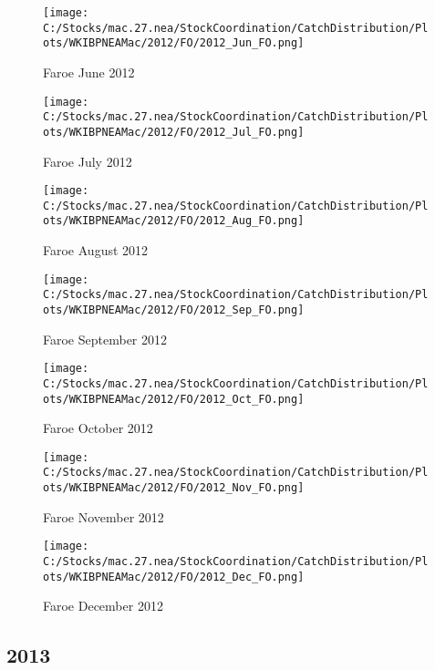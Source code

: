\documentclass{article}
\begin{document}
\begin{figure}
	\centering
		\texttt{[image: C:/Stocks/mac.27.nea/StockCoordination/CatchDistribution/Plots/WKIBPNEAMac/2012/FO/2012\_Jun\_FO.png]}
	\caption{Faroe June 2012}
	\label{fig:2012_Jun_FO}
\end{figure}

\begin{figure}
	\centering
		\texttt{[image: C:/Stocks/mac.27.nea/StockCoordination/CatchDistribution/Plots/WKIBPNEAMac/2012/FO/2012\_Jul\_FO.png]}
	\caption{Faroe July 2012}
	\label{fig:2012_Jul_FO}
\end{figure}

\begin{figure}
	\centering
		\texttt{[image: C:/Stocks/mac.27.nea/StockCoordination/CatchDistribution/Plots/WKIBPNEAMac/2012/FO/2012\_Aug\_FO.png]}
	\caption{Faroe August 2012}
	\label{fig:2012_Aug_FO}
\end{figure}

\begin{figure}
	\centering
		\texttt{[image: C:/Stocks/mac.27.nea/StockCoordination/CatchDistribution/Plots/WKIBPNEAMac/2012/FO/2012\_Sep\_FO.png]}
	\caption{Faroe September 2012}
	\label{fig:2012_Sep_FO}
\end{figure}

\begin{figure}
	\centering
		\texttt{[image: C:/Stocks/mac.27.nea/StockCoordination/CatchDistribution/Plots/WKIBPNEAMac/2012/FO/2012\_Oct\_FO.png]}
	\caption{Faroe October 2012}
	\label{fig:2012_Oct_FO}
\end{figure}

\begin{figure}
	\centering
		\texttt{[image: C:/Stocks/mac.27.nea/StockCoordination/CatchDistribution/Plots/WKIBPNEAMac/2012/FO/2012\_Nov\_FO.png]}
	\caption{Faroe November 2012}
	\label{fig:2012_Nov_FO}
\end{figure}

\begin{figure}
	\centering
		\texttt{[image: C:/Stocks/mac.27.nea/StockCoordination/CatchDistribution/Plots/WKIBPNEAMac/2012/FO/2012\_Dec\_FO.png]}
	\caption{Faroe December 2012}
	\label{fig:2012_Dec_FO}
\end{figure}

\clearpage

\newpage

\subsection{2013}
\end{document}

